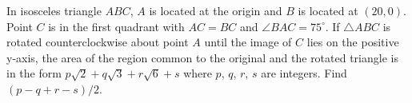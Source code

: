 In isosceles triangle $ABC$, $A$ is located at the origin and $B$ is located at $(20, 0)$.  Point $C$ is in the first quadrant with $AC = BC$ and $\angle BAC = 75^\circ$.  If $\triangle ABC$ is rotated counterclockwise about point $A$ until the image of $C$ lies on the positive y-axis, the area of the region common to the original and the rotated triangle is in the form $p\sqrt{2}+q\sqrt{3}+r\sqrt{6}+s$ where $p$, $q$, $r$, $s$ are integers.  Find $(p-q+r-s)/2$.